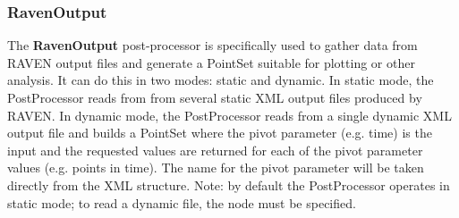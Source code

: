 \subsubsection{RavenOutput}
\label{RavenOutput}
The \textbf{RavenOutput} post-processor is specifically used
to gather data from RAVEN output files and generate a PointSet suitable for plotting or other analysis.
It can do this in two modes: static and dynamic.  In static mode, the
PostProcessor reads from from several static XML output files produced by RAVEN.  In dynamic mode, the PostProcessor
reads from a single dynamic XML output file and builds a PointSet where the pivot parameter (e.g. time) is the
input and the requested values are returned for each of the pivot parameter values (e.g. points in time).  The
name for the pivot parameter will be taken directly from the XML structure.
%
Note: by default the PostProcessor operates in static mode; to read a dynamic file, the  node must
be specified.
%
%
